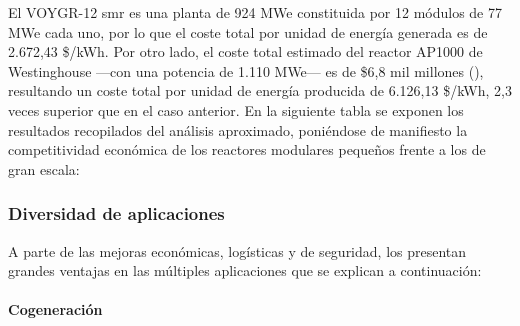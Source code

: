   El VOYGR-12 \acrshort{smr} es una planta de 924 MWe constituida por 12 módulos de 77 MWe cada uno, por lo que el coste total por unidad de energía generada es de 2.672,43 \$/kWh. Por otro lado, el coste total estimado del reactor AP1000 de Westinghouse ---con una potencia de 1.110 MWe--- es de \$6,8 mil millones (\cite{cost_ap1000}), resultando un coste total por unidad de energía producida de 6.126,13 \$/kWh, 2,3 veces superior que en el caso anterior. En la siguiente tabla se exponen los resultados recopilados del análisis aproximado, poniéndose de manifiesto la competitividad económica de los reactores modulares pequeños frente a los de gran escala:

  \begin{table}[h]
    \centering
    \caption{Comparación de costes entre una central nuclear de gran escala de generación III+ y un SMR en fase avanzada de desarrollo (\cite{cost_ap1000} y \cite{cost_evaluation_nuscale}).}
    \label{tab:comparacion_voygr_ap1000}
    \end{table}

\newpage

\subsubsection{Diversidad de aplicaciones}

A parte de las mejoras económicas, logísticas y de seguridad, los  presentan grandes ventajas en las múltiples aplicaciones que se explican a continuación:

\paragraph{Cogeneración} \label{cogeneracion}

